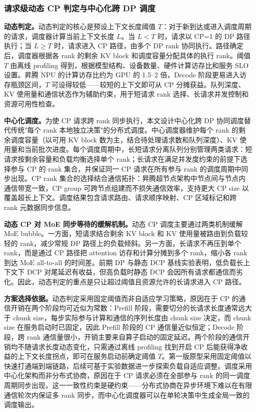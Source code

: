 \subsubsection{请求级动态 CP 判定与中心化跨 DP 调度}

\textbf{动态判定。}动态判定的核心是预设上下文长度阈值 $T$：对于新到达或进入调度周期的请求，调度器计算当前上下文长度 $L$。当 $L<T$ 时，请求以 CP=1 的 DP 路径执行；当 $L\geq T$ 时，请求进入 CP 路径，由多个 DP rank 协同执行。路径确定后，调度器根据各 rank 的剩余 KV block 和调度容量分配具体的执行 rank。阈值 $T$ 由离线 profiling 得到，根据模型结构、设备数量、硬件计算访存比和服务 SLO 设置。昇腾 NPU 的计算访存比约为 GPU 的 1.5--2 倍，Decode 阶段更易进入访存瓶颈区间，$T$ 可设得较低——较短的上下文即可从 CP 分摊获益。队列深度、KV 使用量和通信状态作为辅助约束，用于短请求 rank 选择、长请求并发控制和资源可用性检查。

\textbf{中心化调度。}为使 CP 请求跨 rank 同步执行，本文设计中心化跨 DP 协同调度替代传统"每个 rank 本地独立决策"的分布式调度。中心调度器维护每个 rank 的剩余调度容量（以可用 KV block 数为主，结合待处理请求数和队列深度）、KV 使用量和当前批次进度。每个调度周期中，长短请求分离队列分别管理两类请求：短请求按剩余容量和负载均衡选择单个 rank；长请求在满足并发度约束的前提下选择参与 CP 的 rank 集合，并保证同一 CP 请求在所有参与 rank 的调度周期中同步出现。CP rank 集合的选择结合通信拓扑：昇腾超节点架构中节点间与节点内通信带宽一致，CP group 可跨节点组建而不损失通信效率，支持更大 CP size 以覆盖超长上下文。调度结果包含请求路由、请求顺序映射、CP 区域标记和跨 rank 元数据同步信息。

\textbf{动态 CP 对 MoE 同步等待的缓解机制。}动态 CP 调度主要通过两类机制缓解 MoE bubble。一方面，短请求结合剩余 KV block 和 KV 使用量被路由到负载较轻的 rank，减少常规 DP 路径上的负载倾斜。另一方面，长请求不再压到单个 rank，而是通过 CP 路径把 attention 访存和计算分摊到多个 rank，缩小各 rank 到达 MoE all-to-all 的时间差。前期 DP 与静态 DCP 基线实验表明，低负载长上下文下 DCP 对尾延迟有收益，但高负载时静态 DCP 会因所有请求都通信而劣化。因此，动态判定的重点是只让超过阈值且资源允许的长请求进入 CP 路径。

\textbf{方案选择依据。}动态判定采用固定阈值而非自适应学习策略，原因在于 CP 的通信开销在两个阶段均可近似为常数：Prefill 阶段，需要切分的长请求长度通常远大于 chunk size，每步实际参与计算和通信的序列长度由 chunk size 决定，而 chunk size 在服务启动时已固定，因此 Prefill 阶段的 CP 通信量近似恒定；Decode 阶段，跨 rank 通信量很小，开销主要来自算子启动的固定延迟。两个阶段的通信开销均不随请求长度动态变化，只需通过离线 profiling 找到开启 CP 后能获得净收益的上下文长度拐点，即可在服务启动前确定阈值 $T$。第一版原型采用固定阈值以快速打通端到端链路，后续可基于实验数据进一步探索负载自适应调整。调度采用中心化架构而非分布式协商，原因在于 CP 请求必须在全部参与 rank 的同一调度周期同步出现，这一一致性约束是硬约束——分布式协商在异步环境下难以在有限通信轮次内保证多 rank 同步，而中心化调度器可以在单轮决策中生成全局一致的调度输出。

